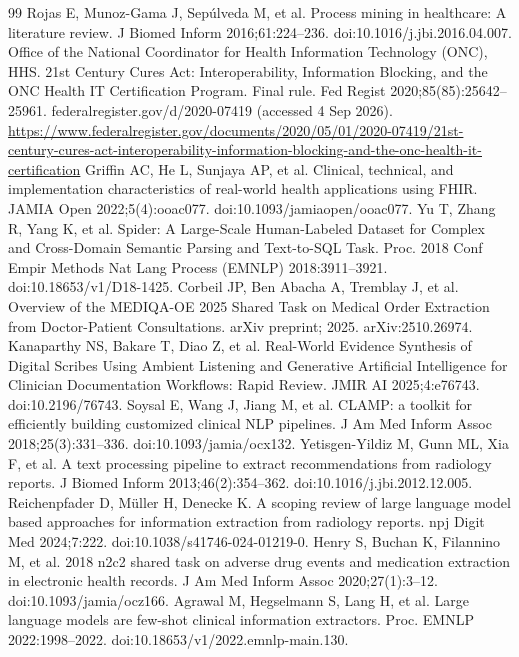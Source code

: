 \documentclass[3p,twocolumn]{elsarticle}
\begin{document}
\begin{thebibliography}{99}
\label{r28} Rojas E, Munoz-Gama J, Sepúlveda M, et al. Process mining in healthcare: A literature review. J Biomed Inform 2016;61:224--236. doi:10.1016/j.jbi.2016.04.007.
\label{r29} Office of the National Coordinator for Health Information Technology (ONC), HHS. 21st Century Cures Act: Interoperability, Information Blocking, and the ONC Health IT Certification Program. Final rule. Fed Regist 2020;85(85):25642--25961. federalregister.gov/d/2020-07419 (accessed 4 Sep 2026). \url{https://www.federalregister.gov/documents/2020/05/01/2020-07419/21st-century-cures-act-interoperability-information-blocking-and-the-onc-health-it-certification}
\label{r30} Griffin AC, He L, Sunjaya AP, et al. Clinical, technical, and implementation characteristics of real-world health applications using FHIR. JAMIA Open 2022;5(4):ooac077. doi:10.1093/jamiaopen/ooac077.
\label{r31} Yu T, Zhang R, Yang K, et al. Spider: A Large-Scale Human-Labeled Dataset for Complex and Cross-Domain Semantic Parsing and Text-to-SQL Task. Proc. 2018 Conf Empir Methods Nat Lang Process (EMNLP) 2018:3911--3921. doi:10.18653/v1/D18-1425.
\label{r32} Corbeil JP, Ben Abacha A, Tremblay J, et al. Overview of the MEDIQA-OE 2025 Shared Task on Medical Order Extraction from Doctor-Patient Consultations. arXiv preprint; 2025. arXiv:2510.26974.
\label{r33} Kanaparthy NS, Bakare T, Diao Z, et al. Real-World Evidence Synthesis of Digital Scribes Using Ambient Listening and Generative Artificial Intelligence for Clinician Documentation Workflows: Rapid Review. JMIR AI 2025;4:e76743. doi:10.2196/76743.
\label{r34} Soysal E, Wang J, Jiang M, et al. CLAMP: a toolkit for efficiently building customized clinical NLP pipelines. J Am Med Inform Assoc 2018;25(3):331--336. doi:10.1093/jamia/ocx132.
\label{r35} Yetisgen-Yildiz M, Gunn ML, Xia F, et al. A text processing pipeline to extract recommendations from radiology reports. J Biomed Inform 2013;46(2):354--362. doi:10.1016/j.jbi.2012.12.005.
\label{r36} Reichenpfader D, Müller H, Denecke K. A scoping review of large language model based approaches for information extraction from radiology reports. npj Digit Med 2024;7:222. doi:10.1038/s41746-024-01219-0.
\label{r37} Henry S, Buchan K, Filannino M, et al. 2018 n2c2 shared task on adverse drug events and medication extraction in electronic health records. J Am Med Inform Assoc 2020;27(1):3--12. doi:10.1093/jamia/ocz166.
\label{r38} Agrawal M, Hegselmann S, Lang H, et al. Large language models are few-shot clinical information extractors. Proc. EMNLP 2022:1998--2022. doi:10.18653/v1/2022.emnlp-main.130.

\end{thebibliography}
\end{document}
